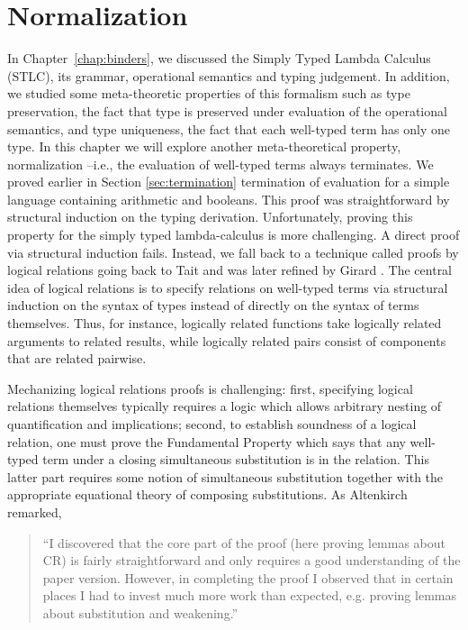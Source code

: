 \chapter{Normalization}\label{chap:normalization}

In Chapter~\ref{chap:binders}, we discussed the Simply Typed Lambda
Calculus (STLC), its grammar, operational semantics and typing
judgement.  In addition, we studied some meta-theoretic properties of
this formalism such as type preservation, the fact that type is
preserved under evaluation of the operational semantics, and type
uniqueness, the fact that each well-typed term has only one type. In
this chapter we will explore another meta-theoretical property,
normalization --i.e., the evaluation of well-typed terms always
terminates. We proved earlier in Section \ref{sec:termination}
termination of evaluation for a simple language containing arithmetic
and booleans. This proof was straightforward by structural induction
on the typing derivation. Unfortunately, proving this property for the
simply typed lambda-calculus is more challenging. A direct proof via
structural induction fails. Instead, we fall back to a technique
called proofs by logical relations going back to Tait  \cite{Tait67}
and was later refined by Girard
\citep{GirardLafontTaylor:proofsAndTypes}. The central idea of logical
relations is to specify relations on well-typed terms via structural
induction on the syntax of types instead of directly on the syntax of
terms themselves. Thus, for instance, logically related functions take
logically related arguments to related results, while  logically
related pairs consist of components that are related pairwise.

Mechanizing logical relations proofs is challenging: first, specifying logical relations themselves typically requires a logic which allows arbitrary nesting of quantification and implications; second, to establish soundness of a logical relation, one must prove the Fundamental Property which says that any well-typed term under a closing simultaneous substitution is in the relation. This latter part requires some notion of simultaneous substitution together with the appropriate equational theory of composing substitutions. As Altenkirch \cite{Altenkirch:TLCA93} remarked,

\begin{quote}
``I discovered that the core part of the proof (here proving lemmas about CR) is fairly straightforward and only requires a good understanding of the paper version. However, in completing the proof I observed that in certain places I had to invest much more work than expected, e.g. proving lemmas about substitution and weakening.''
\end{quote}

